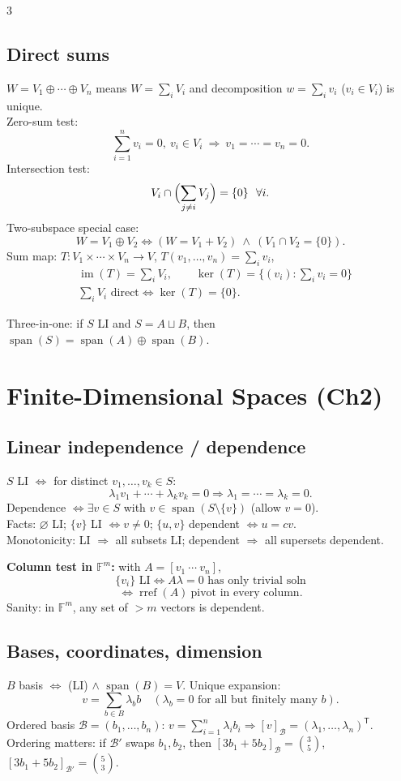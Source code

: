 \documentclass[10pt]{article}
\newcommand{\F}{\mathbb{F}}
\newcommand{\Ker}{\operatorname{ker}}
\newcommand{\im}{\operatorname{im}}
\newcommand{\spann}{\operatorname{span}}
\begin{document}
\begin{multicols}{3}
\subsection*{Direct sums}
$W=V_1\oplus\cdots\oplus V_n$ means $W=\sum_i V_i$ and decomposition $w=\sum_i v_i$ ($v_i\in V_i$) is unique.\\
Zero-sum test:
\[
\sum_{i=1}^n v_i=0,\ v_i\in V_i\ \Rightarrow\ v_1=\cdots=v_n=0.
\]
Intersection test:
\[
V_i\cap\Bigl(\sum_{j\neq i}V_j\Bigr)=\{0\}\ \ \forall i.
\]
Two-subspace special case:
\[
W=V_1\oplus V_2 \iff (W=V_1+V_2)\ \wedge\ (V_1\cap V_2=\{0\}).
\]
Sum map: $T:V_1\times\cdots\times V_n\to V$, $T(v_1,\dots,v_n)=\sum_i v_i$,
\begin{align*}
    &\im(T)=\sum_i V_i, \qquad \Ker(T)=\{(v_i):\sum_i v_i=0\}\\
    &\sum_i V_i \text{ direct} \iff \Ker(T)=\{0\}.
\end{align*}

Three-in-one: if $S$ LI and $S=A\sqcup B$, then $\spann(S)=\spann(A)\oplus\spann(B)$.

\section*{Finite-Dimensional Spaces (Ch2)}

\subsection*{Linear independence / dependence}
$S$ LI $\iff$ for distinct $v_1,\dots,v_k\in S$:
\[
\lambda_1v_1+\cdots+\lambda_kv_k=0\Rightarrow \lambda_1=\cdots=\lambda_k=0.
\]
Dependence $\iff \exists v\in S$ with $v\in\spann(S\setminus\{v\})$ (allow $v=0$).\\
Facts: $\varnothing$ LI; $\{v\}$ LI $\iff v\neq 0$; $\{u,v\}$ dependent $\iff u=cv$.\\
Monotonicity: LI $\Rightarrow$ all subsets LI; dependent $\Rightarrow$ all supersets dependent.

\textbf{Column test in $\F^m$:} with $A=[v_1\ \cdots\ v_n]$,
\[
\{v_i\}\text{ LI}\iff A\lambda=0 \text{ has only trivial soln}
\]
\[
\iff \operatorname{rref}(A)\ \text{pivot in every column}.
\]
Sanity: in $\F^m$, any set of $>m$ vectors is dependent.

\subsection*{Bases, coordinates, dimension}
$B$ basis $\iff$ (LI) $\wedge$ $\spann(B)=V$. Unique expansion:
\[
v=\sum_{b\in B}\lambda_b b\quad(\lambda_b=0\text{ for all but finitely many }b).
\]
Ordered basis $\mathcal{B}=(b_1,\dots,b_n)$: $v=\sum_{i=1}^n\lambda_i b_i\Rightarrow [v]_{\mathcal{B}}=(\lambda_1,\dots,\lambda_n)^{\mathsf T}$.\\
Ordering matters: if $\mathcal{B}'$ swaps $b_1,b_2$, then $[3b_1+5b_2]_{\mathcal{B}}=\binom{3}{5}$, $[3b_1+5b_2]_{\mathcal{B}'}=\binom{5}{3}$.


\end{multicols}
\end{document}
